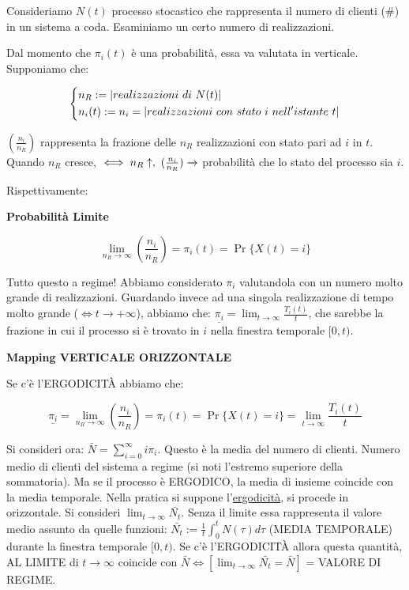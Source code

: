 Consideriamo $N(t)$ processo stocastico che rappresenta il numero di clienti (\#) in un sistema a coda. Esaminiamo un certo numero di realizzazioni.

Dal momento che $\pi_i(t)$ è una probabilità, essa va valutata in verticale. Supponiamo che:

\[
	\left\{
	\begin{aligned}
	&n_R := \cardinality{realizzazioni\ di\ N(t)}\\
	&n_i(t) := n_i = \cardinality{realizzazioni\ con\ stato\ i\ nell'istante\ t}
	\end{aligned}
	\right.
\]

$(\frac{n_i}{n_R})$ rappresenta la frazione delle $n_R$ realizzazioni con stato pari ad $i$ in $t$. Quando $n_R$ cresce, $\iff n_R \uparrow ,\ (\frac{n_i}{n_R}) \tendsto{}$ probabilità che lo stato del processo sia $i$.

Rispettivamente:

\begin{thrm}{\textbf{Probabilità Limite}}

\[
	\lim_{n_R\to\infty}{(\frac{n_i}{n_R})} = \pi_i(t) = \Pr\{X(t)=i\}
\]
\end{thrm}

Tutto questo a regime! Abbiamo considerato $\pi_i$ valutandola con un numero molto grande di realizzazioni. Guardando invece ad una singola realizzazione di tempo molto grande ($\iff t\to +\infty$), abbiamo che: $\underline{\pi_i} = \lim_{t\to\infty}{\frac{T_i(t)}{t}}$, che sarebbe la frazione in cui il processo si è trovato in $i$ nella finestra temporale $[0,t)$.

\begin{thrm}{\textbf{Mapping VERTICALE ORIZZONTALE}}

Se c'è l'ERGODICIT\`A abbiamo che:

\[
	\underline{\pi_i} = \lim_{n_R\to\infty}{(\frac{n_i}{n_R})} = \pi_i(t) = \Pr\{X(t)=i\} = \lim_{t\to\infty}{\frac{T_i(t)}{t}}
\]
\end{thrm}

Si consideri ora: $\bar{N} = \sum_{i=0}^\infty{i\pi_i}$. Questo è la media del numero di clienti. Numero medio di clienti del sistema a regime (si noti l'estremo superiore della sommatoria). Ma se il processo è ERGODICO, la media di insieme coincide con la media temporale. Nella pratica si suppone l'\underline{ergodicità}, si procede in orizzontale. Si consideri $\lim_{t\to\infty}{\bar{N_t}}$. Senza il limite essa rappresenta il valore medio assunto da quelle funzioni: $\bar{N_t} := \frac{1}{t}\int_0^t{N(\tau)d\tau}$ (MEDIA TEMPORALE) durante la finestra temporale $[0,t)$. Se c'è l'ERGODICIT\`A allora questa quantità, AL LIMITE di $t\to\infty$ coincide con $\bar{N} \iff [\lim_{t\to\infty}{\bar{N_t}} = \bar{N}]$ = VALORE DI REGIME.

